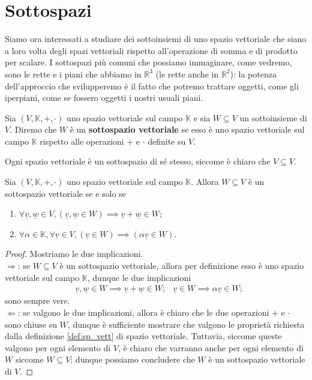 \section{Sottospazi}

Siamo ora interessati a studiare dei sottoinsiemi di uno spazio vettoriale che siano a loro volta degli spazi vettoriali rispetto all'operazione di somma e di prodotto per scalare. I sottospazi più comuni che possiamo immaginare, come vedremo, sono le rette e i piani che abbiamo in $\mathbb{R}^3$ (le rette anche in $\mathbb{R}^2$): la potenza dell'approccio che svilupperemo è il fatto che potremo trattare oggetti, come gli iperpiani, come se fossero oggetti i nostri usuali piani. 
\begin{definition}[sottospazio]
    Sia $(V, \mathbb{K}, +, \cdot)$ uno spazio vettoriale sul campo $\mathbb{K}$ e sia $W \subseteq V$ un sottoinsieme di $V$. Diremo che $W$ è un \textbf{sottospazio vettoriale} se esso è uno spazio vettoriale sul campo $\mathbb{K}$ rispetto alle operazioni $+$ e $\cdot$ definite su $V$.
\end{definition}
\begin{remark}
    Ogni spazio vettoriale è un sottospazio di sé stesso, siccome è chiaro che $V \subseteq V$.
\end{remark}
\begin{prop}
    \label{prop:ssp_vett_iff}
    Sia $(V, \mathbb{K}, +, \cdot)$ uno spazio vettoriale sul campo $\mathbb{K}$. Allora $W \subseteq V$ è un sottospazio vettoriale se e solo se
    \begin{enumerate}[label=\protect\circled{\arabic*}]
        \item $\forall \underline{v}, \underline{w} \in V, (\underline{v}, \underline{w} \in W) \implies \underline{v} + \underline{w} \in W$;
        \item $\forall \alpha \in \mathbb{K}, \forall \underline{v} \in V, (\underline{v} \in W) \implies (\alpha \underline{v} \in W)$.
    \end{enumerate}
\end{prop}
\begin{proof} Mostriamo le due implicazioni. \\
    $\boxed{\Rightarrow}$: se $W \subseteq V$ è un sottospazio vettoriale, allora per definizione esso è uno spazio vettoriale sul campo $\mathbb{K}$, dunque le due implicazioni
    \begin{align}
        &\underline{v}, \underline{w} \in W \implies \underline{v} + \underline{w} \in W;
        &\underline{v} \in W \implies \alpha \underline{v} \in W;
    \end{align}
    sono sempre vere. \\
    $\boxed{\Leftarrow}$: se valgono le due implicazioni, allora è chiaro che le due operazioni $+$ e $\cdot$ sono chiuse su $W$, dunque è sufficiente mostrare che valgono le proprietà richiesta dalla definizione \ref{def:sp_vett} di spazio vettoriale. Tuttavia, siccome queste valgono per ogni elemento di $V$, è chiaro che varranno anche per ogni elemento di $W$ siccome $W \subseteq V$; dunque possiamo concludere che $W$ è un sottospazio vettoriale di $V$.  
\end{proof}

